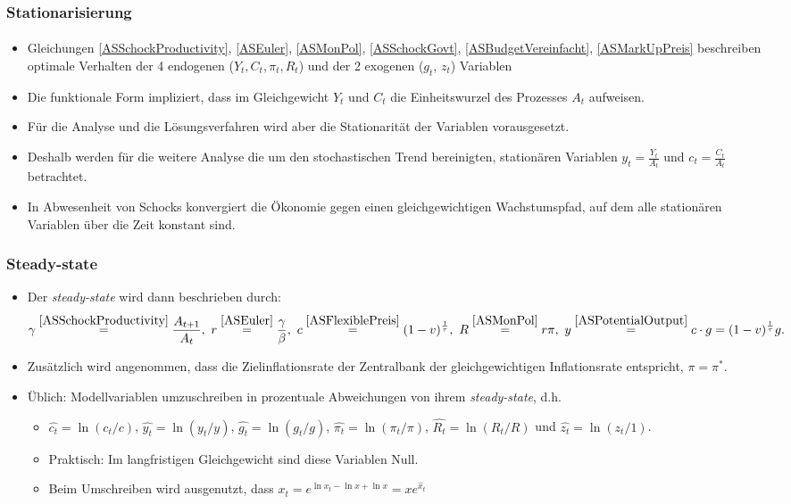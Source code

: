 \documentclass[10pt]{beamer}  %
\begin{document}
\begin{frame}
\frametitle{Stationarisierung}\framesubtitle{}
\begin{itemize}
  \item Gleichungen \eqref{ASSchockProductivity}, \eqref{ASEuler}, \eqref{ASMonPol}, \eqref{ASSchockGovt},  \eqref{ASBudgetVereinfacht}, \eqref{ASMarkUpPreis} beschreiben optimale Verhalten der 4 endogenen ($Y_t, C_t, \pi_t, R_t$) und der 2 exogenen ($g_t$, $z_t$) Variablen
  \item Die funktionale Form impliziert, dass im Gleichgewicht $Y_t$ und $C_t$ die Einheitswurzel des Prozesses $A_t$ aufweisen.
  \item F\"{u}r die Analyse und die L\"{o}sungsverfahren wird aber die Stationarit\"{a}t der Variablen vorausgesetzt.
  \item Deshalb werden f\"{u}r die weitere Analyse die um den stochastischen Trend bereinigten, station\"{a}ren Variablen $y_t = \frac{Y_t}{A_t}$ und $c_t = \frac{C_t}{A_t}$ betrachtet.
  \item In Abwesenheit von Schocks konvergiert die \"{O}konomie gegen einen gleichgewichtigen Wachstumspfad, auf dem alle station\"{a}ren Variablen \"{u}ber die Zeit konstant sind.
\end{itemize}
\end{frame}


\begin{frame}\frametitle{Steady-state}
\begin{itemize}
\item Der \emph{steady-state} wird dann beschrieben durch:
\begin{align}\label{steadystate}
 \gamma \overset{\eqref{ASSchockProductivity}}{=} \frac{A_{t+1}}{A_{t}},~
  r \overset{\eqref{ASEuler}}{=} \frac{\gamma}{\beta},~
 c \overset{\eqref{ASFlexiblePreis}}{=} (1-v)^{\frac{1}{\tau}},~
 R \overset{\eqref{ASMonPol}}{=} r \pi,~
 y \overset{\eqref{ASPotentialOutput}}{=} c\cdot g = (1-v)^{\frac{1}{\tau}}g.
\end{align}
\item Zus\"{a}tzlich wird angenommen, dass die Zielinflationsrate der Zentralbank der gleichgewichtigen Inflationsrate entspricht,
$\pi=\pi^*$.
\item \"{U}blich: Modellvariablen umzuschreiben in prozentuale Abweichungen von ihrem \emph{steady-state}, d.h.
\begin{itemize}
  \item $\widehat{c_t}=\ln(c_t/c)$, $\widehat{y_t} = \ln(y_t/y)$, $\widehat{g_t} = \ln(g_t/g)$, $\widehat{\pi_t} = \ln(\pi_t/\pi)$, $\widehat{R_t}=\ln(R_t/R)$ und $\widehat{z_t}=\ln(z_t/1)$.
  \item Praktisch: Im langfristigen Gleichgewicht sind diese Variablen Null.
  \item Beim Umschreiben wird ausgenutzt, dass $x_t=e^{\ln{x_t}-\ln{x}+\ln{x}}=x e^{\widehat{x}_t}$
\end{itemize}
\end{itemize}
\end{frame}
\end{document}
